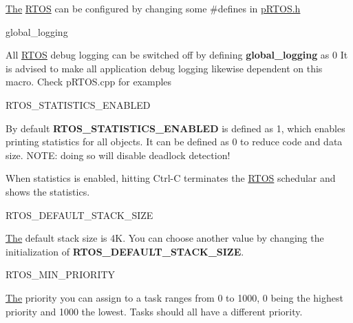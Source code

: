 \hyperlink{class_the}{The} \hyperlink{class_r_t_o_s}{R\+T\+OS} can be configured by changing some \#define\textquotesingle{}s in \hyperlink{p_r_t_o_s_8h_source}{p\+R\+T\+O\+S.\+h}

\begin{DoxyParagraph}{global\+\_\+logging}

\end{DoxyParagraph}
All \hyperlink{class_r_t_o_s}{R\+T\+OS} debug logging can be switched off by defining {\bfseries global\+\_\+logging} as 0 It is advised to make all application debug logging likewise dependent on this macro. Check p\+R\+T\+O\+S.\+cpp for examples

\begin{DoxyParagraph}{R\+T\+O\+S\+\_\+\+S\+T\+A\+T\+I\+S\+T\+I\+C\+S\+\_\+\+E\+N\+A\+B\+L\+ED}

\end{DoxyParagraph}
By default {\bfseries R\+T\+O\+S\+\_\+\+S\+T\+A\+T\+I\+S\+T\+I\+C\+S\+\_\+\+E\+N\+A\+B\+L\+ED} is defined as 1, which enables printing statistics for all objects. It can be defined as 0 to reduce code and data size. N\+O\+TE\+: doing so will disable deadlock detection!

When statistics is enabled, hitting Ctrl-\/C terminates the \hyperlink{class_r_t_o_s}{R\+T\+OS} schedular and shows the statistics.

\begin{DoxyParagraph}{R\+T\+O\+S\+\_\+\+D\+E\+F\+A\+U\+L\+T\+\_\+\+S\+T\+A\+C\+K\+\_\+\+S\+I\+ZE}

\end{DoxyParagraph}
\hyperlink{class_the}{The} default stack size is 4K. You can choose another value by changing the initialization of {\bfseries R\+T\+O\+S\+\_\+\+D\+E\+F\+A\+U\+L\+T\+\_\+\+S\+T\+A\+C\+K\+\_\+\+S\+I\+ZE}.

\begin{DoxyParagraph}{R\+T\+O\+S\+\_\+\+M\+I\+N\+\_\+\+P\+R\+I\+O\+R\+I\+TY}

\end{DoxyParagraph}
\hyperlink{class_the}{The} priority you can assign to a task ranges from 0 to 1000, 0 being the highest priority and 1000 the lowest. Tasks should all have a different priority. 
